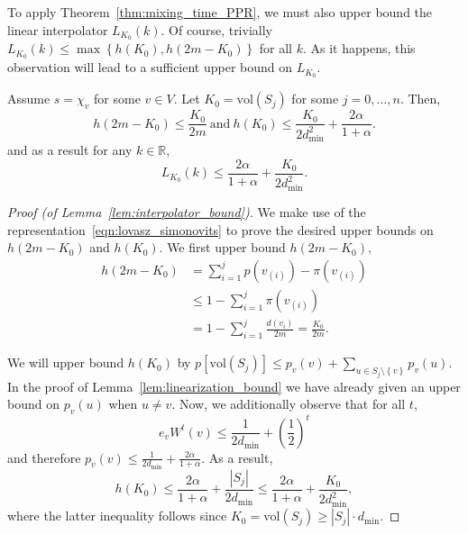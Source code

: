 \documentclass[11pt,twoside]{article}
\newcommand{\set}[1]{\left\{#1\right\}}
\newcommand{\vol}{\mathrm{vol}}
\newcommand{\abs}[1]{\left \lvert #1 \right \rvert}
\newcommand{\Reals}{\mathbb{R}}
\newcommand{\1}{\mathbbm{1}}
\begin{document}
To apply Theorem~\ref{thm:mixing_time_PPR}, we must also upper bound the linear interpolator $L_{K_0}(k)$. Of course, trivially $L_{K_0}(k) \leq \max\set{h(K_0), h(2m - K_0)}$ for all $k$. As it happens, this observation will lead to a sufficient upper bound on $L_{K_0}$.
\begin{lemma}
	\label{lem:interpolator_bound}
	Assume $s = \chi_v$ for some $v \in V$. Let $K_0 = \vol(S_j)$ for some $j = 0,\ldots,n$. Then, 
	\begin{equation*}
	h(2m - K_0) \leq \frac{K_0}{2m} ~\mathrm{and}~ h(K_0) \leq \frac{K_0}{2d_{\min}^2} + \frac{2\alpha}{1 + \alpha}.
	\end{equation*}
	and as a result for any $k \in \Reals$,
	\begin{equation*}
	L_{K_0}(k) \leq \frac{2\alpha}{1 + \alpha} + \frac{K_0}{2d_{\min}^2}.
	\end{equation*}
\end{lemma}
\begin{proof}[Proof (of Lemma~\ref{lem:interpolator_bound})]
	We make use of the representation~\eqref{eqn:lovasz_simonovits} to prove the desired upper bounds on $h(2m - K_0)$ and $h(K_0)$. We first upper bound $h(2m - K_0)$,
	\begin{align*}
	h(2m - K_0) & = \sum_{i = 1}^{j} p(v_{(i)}) - \pi(v_{(i)}) \\
	& \leq 1 - \sum_{i = 1}^{j} \pi(v_{(i)}) \\
	& = 1 - \sum_{i = 1}^{j} \frac{d(v_{i})}{2m} = \frac{K_0}{2m}.
	\end{align*}
	
	We will upper bound $h(K_0)$ by $p[\vol(S_j)] \leq p_v(v) + \sum_{u \in S_j \setminus \set{v}}p_v(u)$. In the proof of Lemma~\ref{lem:linearization_bound} we have already given an upper bound on $p_v(u)$ when $u \neq v$. Now, we additionally observe that for all $t$,
	\begin{equation*}
	e_vW^t(v) \leq \frac{1}{2d_{\min}} + \left(\frac{1}{2}\right)^t
	\end{equation*}
	and therefore $p_v(v) \leq \frac{1}{2d_{\min}} + \frac{2\alpha}{1 + \alpha}$.
	As a result,
	\begin{equation}
	h(K_0) \leq \frac{2\alpha}{1 + \alpha} + \frac{\abs{S_j}}{2d_{\min}} \leq \frac{2\alpha}{1 + \alpha} + \frac{K_0}{2d_{\min}^2},
	\end{equation}
	where the latter inequality follows since $K_0 = \vol(S_j) \geq \abs{S_j}\cdot d_{\min}$.
\end{proof}
\end{document}
